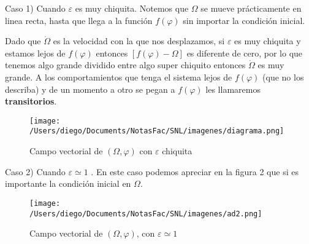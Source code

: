 Caso 1) Cuando $\varepsilon$ es muy chiquita. Notemos que $\Omega$ se mueve prácticamente en linea recta, hasta que llega a la función $f(\varphi)$ sin importar la condición inicial.
\begin{tcolorbox}[colback=Black!5,colframe=White] 
  \begin{nota}
    Dado que $ \dot{\Omega} $ es la velocidad con la que nos desplazamos, si $\varepsilon$ es muy chiquita y estamos lejos de $f(\varphi)$ entonces $[f(\varphi)-\Omega]$ es diferente de cero, por lo que tenemos algo grande dividido entre algo super chiquito entonces $ \dot{\Omega} $ es muy grande. A los comportamientos que tenga el sistema lejos de $f(\varphi)$ (que no los describa) y de un momento a otro se pegan a $f(\varphi)$ les llamaremos  \textbf{transitorios}.   
\end{nota}
\end{tcolorbox}


\begin{figure}[htpb]
  \centering
  \texttt{[image: /Users/diego/Documents/NotasFac/SNL/imagenes/diagrama.png]}
  \caption{Campo vectorial de $(\Omega,\varphi)$ con $\varepsilon$ chiquita}
\end{figure}
             
Caso 2) Cuando $\varepsilon \simeq 1$ . En este caso podemos apreciar en la figura 2 que si es importante la condición inicial en $\Omega$.
\begin{figure}[htpb]
  \centering
\texttt{[image: /Users/diego/Documents/NotasFac/SNL/imagenes/ad2.png]}
  \caption{Campo vectorial de $(\Omega,\varphi)$, con $\varepsilon \simeq 1 $ }
\end{figure}


